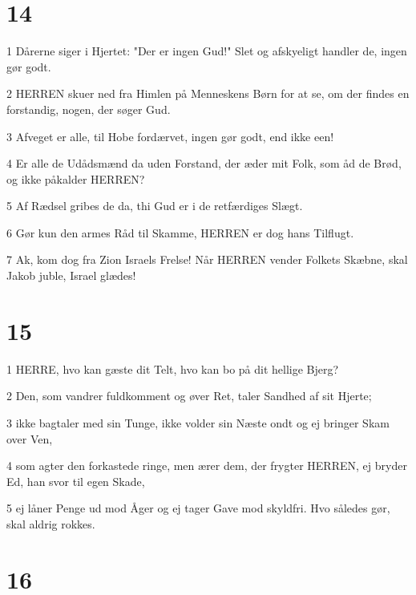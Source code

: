 \chapter{14}

\par 1 Dårerne siger i Hjertet: "Der er ingen Gud!" Slet og afskyeligt handler de, ingen gør godt.
\par 2 HERREN skuer ned fra Himlen på Menneskens Børn for at se, om der findes en forstandig, nogen, der søger Gud.
\par 3 Afveget er alle, til Hobe fordærvet, ingen gør godt, end ikke een!
\par 4 Er alle de Udådsmænd da uden Forstand, der æder mit Folk, som åd de Brød, og ikke påkalder HERREN?
\par 5 Af Rædsel gribes de da, thi Gud er i de retfærdiges Slægt.
\par 6 Gør kun den armes Råd til Skamme, HERREN er dog hans Tilflugt.
\par 7 Ak, kom dog fra Zion Israels Frelse! Når HERREN vender Folkets Skæbne, skal Jakob juble, Israel glædes!

\chapter{15}

\par 1 HERRE, hvo kan gæste dit Telt, hvo kan bo på dit hellige Bjerg?
\par 2 Den, som vandrer fuldkomment og øver Ret, taler Sandhed af sit Hjerte;
\par 3 ikke bagtaler med sin Tunge, ikke volder sin Næste ondt og ej bringer Skam over Ven,
\par 4 som agter den forkastede ringe, men ærer dem, der frygter HERREN, ej bryder Ed, han svor til egen Skade,
\par 5 ej låner Penge ud mod Åger og ej tager Gave mod skyldfri. Hvo således gør, skal aldrig rokkes.

\chapter{16}

